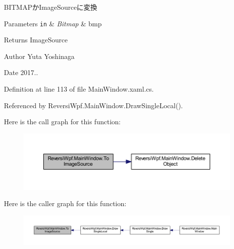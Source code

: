 B\+I\+T\+M\+A\+Pか\+Image\+Sourceに変換 


\begin{DoxyParams}[1]{Parameters}
\mbox{\tt in}  & {\em Bitmap} & bmp \\
\hline
\end{DoxyParams}
\begin{DoxyReturn}{Returns}
Image\+Source 
\end{DoxyReturn}
\begin{DoxyAuthor}{Author}
Yuta Yoshinaga 
\end{DoxyAuthor}
\begin{DoxyDate}{Date}
2017.. 
\end{DoxyDate}


Definition at line 113 of file Main\+Window.\+xaml.\+cs.



Referenced by Reversi\+Wpf.\+Main\+Window.\+Draw\+Single\+Local().

Here is the call graph for this function\+:
\nopagebreak
\begin{figure}[H]
\begin{center}
\leavevmode
\includegraphics[width=350pt]{class_reversi_wpf_1_1_main_window_a5c093af07e7e92f21127941dff8e8684_cgraph}
\end{center}
\end{figure}
Here is the caller graph for this function\+:
\nopagebreak
\begin{figure}[H]
\begin{center}
\leavevmode
\includegraphics[width=350pt]{class_reversi_wpf_1_1_main_window_a5c093af07e7e92f21127941dff8e8684_icgraph}
\end{center}
\end{figure}
\mbox{\label{class_reversi_wpf_1_1_main_window_aa776c697ed89869c9799576f2f6022b9}} 
